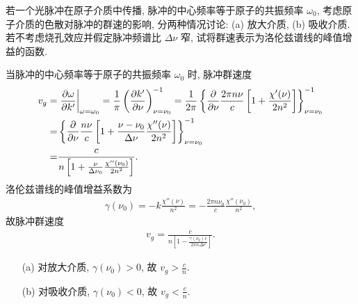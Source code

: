 \documentclass{note}
\begin{document}
\begin{exe}
    若一个光脉冲在原子介质中传播, 脉冲的中心频率等于原子的共振频率 $\omega_0$, 考虑原子介质的色散对脉冲的群速的影响, 分两种情况讨论: (a) 放大介质, (b) 吸收介质. 若不考虑烧孔效应并假定脉冲频谱比 $\Delta\nu$ 窄, 试将群速表示为洛伦兹谱线的峰值增益的函数.
\end{exe}
\begin{sol}
    当脉冲的中心频率等于原子的共振频率 $\omega_0$ 时, 脉冲群速度
    \begin{align}
        \notag v_g=&\left.\frac{\partial\omega}{\partial k'}\right|_{\omega=\omega_0}=\frac{1}{\pi}\left(\frac{\partial k'}{\partial\nu}\right)^{-1}_{\nu=\nu_0}=\frac{1}{2\pi}\left\{\frac{\partial}{\partial\nu}\frac{2\pi n\nu}{c}\left[1+\frac{\chi'(\nu)}{2n^2}\right]\right\}^{-1}_{\nu=\nu_0}\\
        \notag=&\left\{\frac{\partial}{\partial\nu}\frac{n\nu}{c}\left[1+\frac{\nu-\nu_0}{\Delta\nu}\frac{\chi''(\nu)}{2n^2}\right]\right\}^{-1}_{\nu=\nu_0}\\
        =&\frac{c}{n\left[1+\frac{\nu}{\Delta\nu_0}\frac{\chi''(\nu_0)}{2n^2}\right]}.
    \end{align}
    洛伦兹谱线的峰值增益系数为
    \begin{align}
        \gamma(\nu_0)=-k\frac{\chi''(\nu)}{n^2}=-\frac{2\pi n\nu_0}{c}\frac{\chi''(\nu_0)}{n^2},
    \end{align}
    故脉冲群速度
    \begin{align}
        v_g=\frac{c}{n\left[1-\frac{\gamma(\nu_0)c}{2\pi n\Delta\nu}\right]}.
    \end{align}
    \begin{itemize}
        \item[(a)] 对放大介质, $\gamma(\nu_0)>0$, 故 $v_g>\frac{c}{n}$.
        \item[(b)] 对吸收介质, $\gamma(\nu_0)<0$, 故 $v_g<\frac{c}{n}$.
    \end{itemize}
\end{sol}
\end{document}
